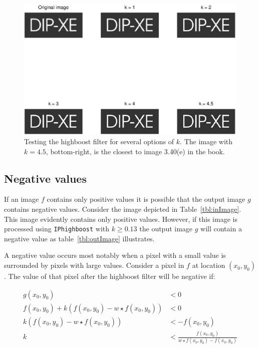 \begin{figure}[ht]
 \centering
 \includegraphics[width=\linewidth]{dipxe.eps}
 \caption{Testing the highboost filter for several options of $k$. The image with $k = 4.5$, bottom-right, is the closest to image 3.40(e) in the book.}
 \label{fig:dipxe}
\end{figure}

\subsection{Negative values}
If an image \(f\) contains only positive values it is possible that the output image \(g\) contains negative values.
Consider the image depicted in Table~\ref{tbl:inImage}.
This image evidently contains only positive values.
However, if this image is processed using \texttt{IPhighboost} with \(k \geq 0.13\) the output image \(g\) will contain a negative value as table~\ref{tbl:outImage} illustrates.

A negative value occurs most notably when a pixel with a small value is surrounded by pixels with large values.
Consider a pixel in \(f\) at location \(( x_0, y_0 )\).
The value of that pixel after the highboost filter will be negative if:

\begin{equation} \label{zero_pixel}
  \begin{split}
    g(x_0, y_0) &< 0 \\
    f(x_0, y_0) +  k(f(x_0, y_0) - w \star f(x_0, y_0)) &< 0 \\
    k(f(x_0, y_0) - w \star f(x_0, y_0)) &< -f(x_0, y_0) \\
    k &< \frac{f(x_0, y_0)}{w \star f(x_0, y_0) - f(x_0, y_0)}
  \end{split}
\end{equation}

